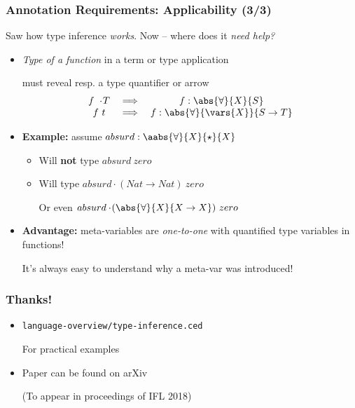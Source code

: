\documentclass{beamer}
\begin{document}
\begin{frame}
  \frametitle{Annotation Requirements: Applicability (3/3)}

  Saw how type inference \textit{works}. Now -- where does it
  \textit{need help?}

  \begin{itemize}
  \item<2-> \textit{Type of a function} in a term or type application

    must reveal resp. a type quantifier or arrow
    \[
      \begin{array}{ccc}
        f\ \cdot\!T & \implies & f : \abs{\forall}{X}{S}
        \\ f\ t & \implies & f : \abs{\forall}{\vars{X}}{S \to T}
      \end{array}
    \]
  \item<3-> \textbf{Example:} assume $absurd : \aabs{\forall}{X}{\star}{X}$
    \begin{itemize}
    \item<4-> Will \textbf{not} type $absurd\ zero$
    \item<4-> Will type $absurd \cdot\!(Nat \to Nat)\ zero$

      Or even $absurd \cdot\!(\abs{\forall}{X}{X \to X})\ zero$
    \end{itemize}

  \item<5-> \textbf{Advantage:} meta-variables are \textit{one-to-one} with
    quantified type variables in functions!

    It's always easy to understand why a meta-var was introduced!
  \end{itemize}
\end{frame}

\begin{frame}
  \frametitle{Thanks!}

  \begin{itemize}
  \item \texttt{language-overview/type-inference.ced}

    For practical examples

  \item Paper can be found on arXiv

    (To appear in proceedings of IFL 2018)
  \end{itemize}
\end{frame}

\end{document}
